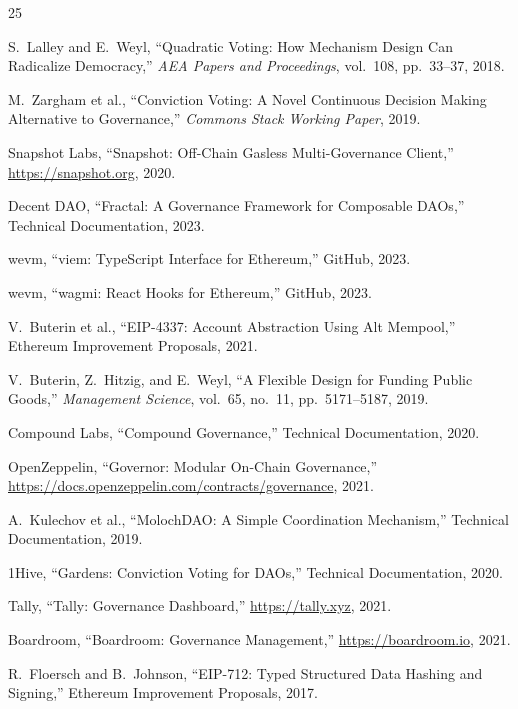 \documentclass[11pt,letterpaper]{article}
\begin{document}

\begin{thebibliography}{25}

S.~Lalley and E.~Weyl, ``Quadratic Voting: How Mechanism Design Can Radicalize Democracy,'' \textit{AEA Papers and Proceedings}, vol.~108, pp.~33--37, 2018.

M.~Zargham et al., ``Conviction Voting: A Novel Continuous Decision Making Alternative to Governance,'' \textit{Commons Stack Working Paper}, 2019.

Snapshot Labs, ``Snapshot: Off-Chain Gasless Multi-Governance Client,'' \url{https://snapshot.org}, 2020.

Decent DAO, ``Fractal: A Governance Framework for Composable DAOs,'' Technical Documentation, 2023.

wevm, ``viem: TypeScript Interface for Ethereum,'' GitHub, 2023.

wevm, ``wagmi: React Hooks for Ethereum,'' GitHub, 2023.

V.~Buterin et al., ``EIP-4337: Account Abstraction Using Alt Mempool,'' Ethereum Improvement Proposals, 2021.

V.~Buterin, Z.~Hitzig, and E.~Weyl, ``A Flexible Design for Funding Public Goods,'' \textit{Management Science}, vol.~65, no.~11, pp.~5171--5187, 2019.

Compound Labs, ``Compound Governance,'' Technical Documentation, 2020.

OpenZeppelin, ``Governor: Modular On-Chain Governance,'' \url{https://docs.openzeppelin.com/contracts/governance}, 2021.

A.~Kulechov et al., ``MolochDAO: A Simple Coordination Mechanism,'' Technical Documentation, 2019.

1Hive, ``Gardens: Conviction Voting for DAOs,'' Technical Documentation, 2020.

Tally, ``Tally: Governance Dashboard,'' \url{https://tally.xyz}, 2021.

Boardroom, ``Boardroom: Governance Management,'' \url{https://boardroom.io}, 2021.

R.~Floersch and B.~Johnson, ``EIP-712: Typed Structured Data Hashing and Signing,'' Ethereum Improvement Proposals, 2017.


\end{thebibliography}
\end{document}
